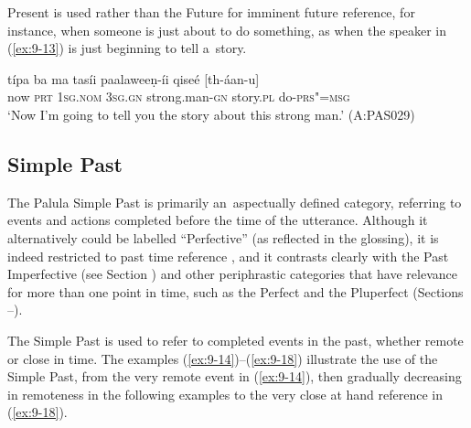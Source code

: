 Present is used rather than the Future for imminent future reference, for instance, when someone is just about to do something, as when the speaker in (\ref{ex:9-13}) is just beginning to tell a~story.

\begin{exe}
\ex
\label{ex:9-13}
\gll típa ba ma tasíi paalaweeṇ-íi qiseé [th-áan-u] \\
now \textsc{prt} 1\textsc{sg.nom} 3\textsc{sg.gn} strong.man-\textsc{gn} story.\textsc{pl} do-\textsc{prs"=msg} \\
\glt `Now I'm going to tell you the story about this strong man.' (A:PAS029)
\end{exe}

\subsection{Simple Past}
\label{subsec:9-1-4}


The Palula Simple Past is primarily an~aspectually defined category, referring to events and actions completed before the time of the utterance. Although it alternatively could be labelled ``Perfective'' (as reflected in the glossing), it is indeed restricted to past time reference \citep[79]{dahl1985}, and it contrasts clearly with the Past Imperfective (see Section ) and other periphrastic categories that have relevance for more than one point in time, such as the Perfect and the Pluperfect (Sections --).



The Simple Past is used to refer to completed events in the past, whether remote or close in time. The examples (\ref{ex:9-14})--(\ref{ex:9-18}) illustrate the use of the Simple Past, from the very remote event in (\ref{ex:9-14}), then gradually decreasing in remoteness in the following examples to the very close at hand reference in (\ref{ex:9-18}).

